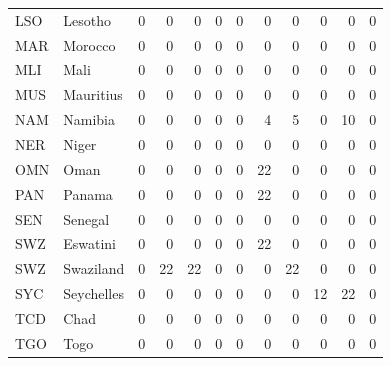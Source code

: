 \begin{table}
\begin{tabular}[t]{llrrrrrrrrrr}
LSO & Lesotho & 0 & 0 & 0 & 0 & 0 & 0 & 0 & 0 & 0 & 0\\
MAR & Morocco & 0 & 0 & 0 & 0 & 0 & 0 & 0 & 0 & 0 & 0\\
MLI & Mali & 0 & 0 & 0 & 0 & 0 & 0 & 0 & 0 & 0 & 0\\
MUS & Mauritius & 0 & 0 & 0 & 0 & 0 & 0 & 0 & 0 & 0 & 0\\
\addlinespace
NAM & Namibia & 0 & 0 & 0 & 0 & 0 & 4 & 5 & 0 & 10 & 0\\
NER & Niger & 0 & 0 & 0 & 0 & 0 & 0 & 0 & 0 & 0 & 0\\
OMN & Oman & 0 & 0 & 0 & 0 & 0 & 22 & 0 & 0 & 0 & 0\\
PAN & Panama & 0 & 0 & 0 & 0 & 0 & 22 & 0 & 0 & 0 & 0\\
SEN & Senegal & 0 & 0 & 0 & 0 & 0 & 0 & 0 & 0 & 0 & 0\\
\addlinespace
SWZ & Eswatini & 0 & 0 & 0 & 0 & 0 & 22 & 0 & 0 & 0 & 0\\
SWZ & Swaziland & 0 & 22 & 22 & 0 & 0 & 0 & 22 & 0 & 0 & 0\\
SYC & Seychelles & 0 & 0 & 0 & 0 & 0 & 0 & 0 & 12 & 22 & 0\\
TCD & Chad & 0 & 0 & 0 & 0 & 0 & 0 & 0 & 0 & 0 & 0\\
TGO & Togo & 0 & 0 & 0 & 0 & 0 & 0 & 0 & 0 & 0 & 0\\
\bottomrule
\end{tabular}
\end{table}
